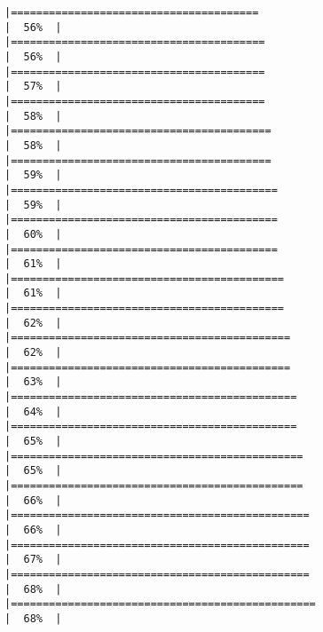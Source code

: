\documentclass[
]{book}
\begin{document}
\begin{verbatim}
|=======================================                               |  56%  |                                                                              |========================================                              |  56%  |                                                                              |========================================                              |  57%  |                                                                              |========================================                              |  58%  |                                                                              |=========================================                             |  58%  |                                                                              |=========================================                             |  59%  |                                                                              |==========================================                            |  59%  |                                                                              |==========================================                            |  60%  |                                                                              |==========================================                            |  61%  |                                                                              |===========================================                           |  61%  |                                                                              |===========================================                           |  62%  |                                                                              |============================================                          |  62%  |                                                                              |============================================                          |  63%  |                                                                              |=============================================                         |  64%  |                                                                              |=============================================                         |  65%  |                                                                              |==============================================                        |  65%  |                                                                              |==============================================                        |  66%  |                                                                              |===============================================                       |  66%  |                                                                              |===============================================                       |  67%  |                                                                              |===============================================                       |  68%  |                                                                              |================================================                      |  68%  |                                                                              
\end{verbatim}
\end{document}
